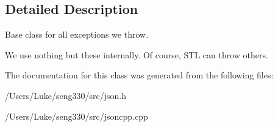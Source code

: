 \subsection{Detailed Description}
Base class for all exceptions we throw.

We use nothing but these internally. Of course, S\+T\+L can throw others. 

The documentation for this class was generated from the following files\+:\begin{DoxyCompactItemize}
\item 
/\+Users/\+Luke/seng330/src/json.\+h\item 
/\+Users/\+Luke/seng330/src/jsoncpp.\+cpp\end{DoxyCompactItemize}
